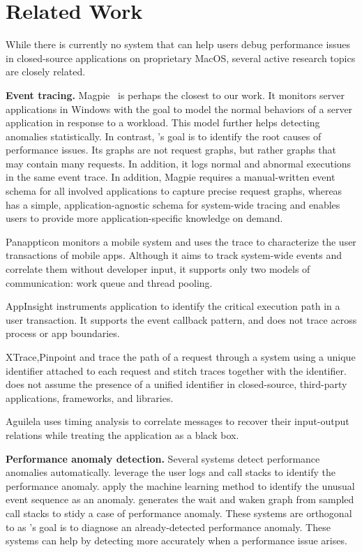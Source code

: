 \section{Related Work}

While there is currently no system that can help users debug performance
issues in closed-source applications on proprietary MacOS, several active
research topics are closely related.

\textbf{Event tracing.}  Magpie~\cite{barham2004using} is perhaps the closest to
our work.  It monitors server applications in Windows with the goal to model
the normal behaviors of a server application in response to a workload.  This
model further helps detecting anomalies statistically.  In contrast, \xxx's
goal is to identify the root causes of performance issues.  Its graphs are not
request graphs, but rather graphs that may contain many requests.  In addition,
it logs normal and abnormal executions in the same event trace.  In addition,
Magpie requires a manual-written event schema for all involved applications to
capture precise request graphs, whereas \xxx has a simple, application-agnostic
schema for system-wide tracing and enables users to provide more
application-specific knowledge on demand.

Panappticon \cite{zhang2013panappticon} monitors a mobile system and uses the
trace to characterize the user transactions of mobile apps.  Although it
aims to track system-wide events and correlate them without developer
input, it supports only two models of communication: work queue and thread
pooling.

AppInsight \cite{ravindranath2012appinsight} instruments application to
identify the critical execution path in a user transaction.  It supports the
event callback pattern, and does not trace across process or app boundaries.

XTrace\cite{fonseca2007x},Pinpoint \cite{chen2002pinpoint} and
\cite{chow2014mystery} trace the path of a request through a system using
a unique identifier attached to each request and stitch traces together with
the identifier.  \xxx does not assume the presence of a unified identifier in
closed-source, third-party applications, frameworks, and libraries.

Aguilela \cite{aguilera2003performance} uses timing analysis to correlate
messages to recover their input-output relations while treating the application
as a black box.

\textbf{Performance anomaly detection.}  Several systems detect performance
anomalies automatically.  \cite{han2012performance} \cite{yuan2012conservative}
leverage the user logs and call stacks to identify the performance anomaly.
\cite{cohen2004correlating} \cite{saidi2008full} \cite{xu2009detecting}
\cite{du2017deeplog}apply the machine learning method to identify the unusual
event sequence as an anomaly.  \cite{yu2014comprehending} generates the wait
and waken graph from sampled call stacks to stidy a case of performance
anomaly.  These systems are orthogonal to \xxx as \xxx's goal is to diagnose an
already-detected performance anomaly.  These systems can help \xxx by detecting
more accurately when a performance issue arises.
